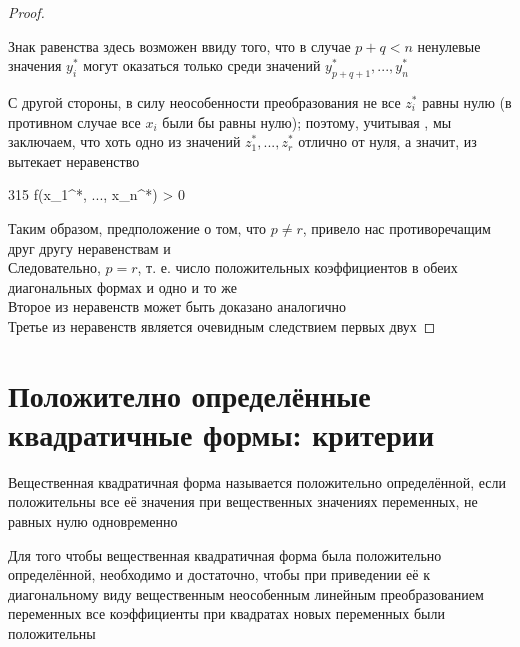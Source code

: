 \begin{proof}
	\begin{note}
		Знак равенства здесь возможен ввиду того, что в случае $ p + q < n $ ненулевые значения $ y_i^* $ могут оказаться только среди значений $ y_{p + q + 1}^*, ..., y_n^* $
	\end{note}
	С другой стороны, в силу неособенности преобразования  не все $ z_i^* $ равны нулю (в противном случае все $ x_i $ были бы равны нулю); поэтому, учитывая , мы заключаем, что хоть одно из значений $ z_1^*, ..., z_r^* $ отлично от нуля, а значит, из  вытекает неравенство
	\begin{equ}{315}
		f(x_1^*, ..., x_n^*) > 0
	\end{equ}
	Таким образом, предположение о том, что $ p \ne r $, привело нас противоречащим друг другу неравенствам  и  \\
	Следовательно, $ p = r $, т. е. число положительных коэффициентов в обеих диагональных формах  и  одно и то же \\
	Второе из неравенств  может быть доказано аналогично \\
	Третье из неравенств  является очевидным следствием первых двух
\end{proof}

\section{Положително определённые квадратичные формы: критерии}

\begin{definition}
	Вещественная квадратичная форма называется положительно определённой, если положительны все её значения при вещественных значениях переменных, не равных нулю одновременно
\end{definition}

\begin{theorem}\label{th:42}
	Для того чтобы вещественная квадратичная форма была положительно определённой, необходимо и достаточно, чтобы при приведении её к диагональному виду вещественным неособенным линейным преобразованием переменных все коэффициенты при квадратах новых переменных были положительны
\end{theorem}

